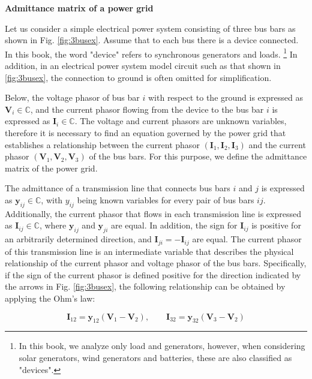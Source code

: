 \documentclass[graybox, envcountchap]{svmult}
\begin{document}
\begin{example}{\textbf{Admittance matrix of a power grid}}\label{ex:derY}

  Let us consider a simple electrical power system consisting of three bus bars as
  shown in Fig. \ref{fig:3busex}. Assume that to each bus there is a device
  connected. In this book, the word "device" refers to synchronous generators and
  loads. \footnote{In this book, we analyze only load and generators, however,
  when considering solar generators, wind generators and batteries, these are also
  classified as "devices".} In addition, in an electrical power system model
  circuit such as that shown in \ref{fig:3busex}, the connection to ground is
  often omitted for simplification.

  Below, the voltage phasor of bus bar $i$ with respect to the ground is expressed
  as $\bm{V}_i \in \mathbb{C}$, and the current phasor flowing from the device to
  the bus bar $i$ is expressed as $\bm{I}_i \in \mathbb{C}$. The voltage and
  current phasors are unknown variables, therefore it is necessary to find an
  equation governed by the power grid that establishes a relationship between the
  current phasor $(\bm{I}_1,\bm{I}_2,\bm{I}_3)$ and the current phasor
  $(\bm{V}_1,\bm{V}_2,\bm{V}_3)$ of the bus bars. For this purpose, we define the
  admittance matrix of the power grid. 

  The admittance of a transmission line that connects bus bars $i$ and $j$ is
  expressed as $\bm{y}_{ij}\in \mathbb{C}$, with $y_{ij}$ being known variables
  for every pair of bus bars $ij$. Additionally, the current phasor that flows in
  each transmission line is expressed as $\bm{I}_{ij}\in \mathbb{C}$, where
  $\bm{y}_{ij}$ and $\bm{y}_{ji}$ are equal. In addition, the sign for
  $\bm{I}_{ij}$ is positive for an arbitrarily determined direction, and
  $\bm{I}_{ji} = -\bm{I}_{ij}$ are equal. The current phasor of this transmission
  line is an intermediate variable that describes the physical relationship of the
  current phasor and voltage phasor of the bus bars. Specifically, if the sign of
  the current phasor is defined positive for the direction indicated by the arrows
  in Fig. \ref{fig:3busex}, the following relationship can be obtained by applying
  the Ohm's law:

  \begin{equation*}
  \bm{I}_{12}=\bm{y}_{12}(\bm{V}_{1}-\bm{V}_{2}),\qquad
  \bm{I}_{32}=\bm{y}_{32}(\bm{V}_{3}-\bm{V}_{2})
  \end{equation*}



\end{example}
\end{document}
